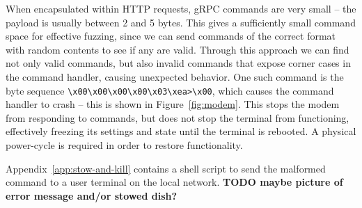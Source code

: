 When encapsulated within HTTP requests, gRPC commands are very small -- the payload is usually between 2 and 5 bytes.
This gives a sufficiently small command space for effective fuzzing, since we can send commands of the correct format with random contents to see if any are valid.
Through this approach we can find not only valid commands, but also invalid commands that expose corner cases in the command handler, causing unexpected behavior.
One such command is the byte sequence \lstinline{\x00\x00\x00\x00\x03\xea>\x00}, which causes the command handler to crash -- this is shown in Figure~\ref{fig:modem}.
This stops the modem from responding to commands, but does not stop the terminal from functioning, effectively freezing its settings and state until the terminal is rebooted.
A physical power-cycle is required in order to restore functionality.

Appendix~\ref{app:stow-and-kill} contains a shell script to send the malformed command to a user terminal on the local network.
\textbf{TODO maybe picture of error message and/or stowed dish?}